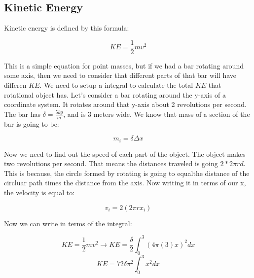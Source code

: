 \subsection{Kinetic Energy}

Kinetic energy is defined by this formula: 

\begin{equation}
	KE = \frac{1}{2}mv^2 
\end{equation}

This is a simple equation for point masses, but if we had a bar rotating around some axis, then we need to consider
that different parts of that bar will have differen $KE$. We need to setup a integral to calculate the total $KE$ that 
rotational object has. Let's consider a bar rotating around the y-axis of a coordinate system. It rotates around that y-axis about 2 revolutions per second. The bar has $\delta = \frac{5kg}{m}$, and is 3 meters wide.
We know that mass of a section of the bar is going to be: 

\begin{equation}
	m_i = \delta \Delta x
\end{equation}

Now we need to find out the speed of each part of the object. The object makes 
two revolutions per second. That means the distances traveled is going $2*2\pi rd$. This is because, the circle formed by rotating is going to equalthe distance of the circluar path times the distance from the axis. Now writing it in terms of our x, the velocity is equal to: 

\begin{equation}
	v_i = 2(2\pi rx_i)
\end{equation}

Now we can write in terms of the integral: 

\begin{equation}
	KE = \frac{1}{2}mv^2 \to KE = \frac{\delta}{2}\int_0^3{(4\pi(3)x)^2}dx
\end{equation}
\begin{equation}
	KE = {72\delta\pi^2}\int_0^3{x^2}dx 
\end{equation}

% 	
